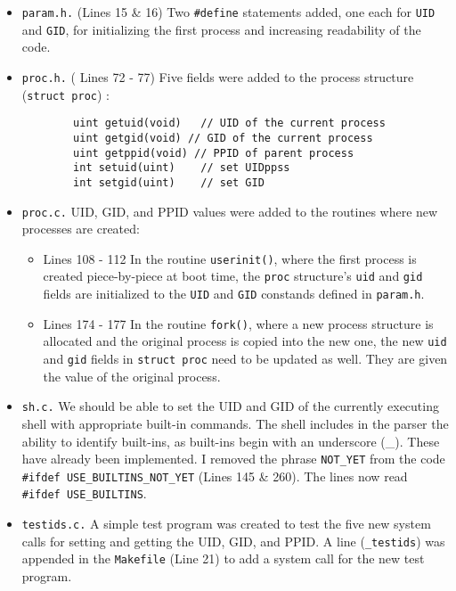 \documentclass[11pt,letterpaper]{report}
\begin{document}
	\begin{itemize}
		
		\item {\tt param.h.} ({\color{red}Lines 15 \& 16}) Two {\tt \#define} statements added, one each for {\tt UID} and {\tt GID}, for initializing the first process and increasing readability of the code.
		
		\item {\tt proc.h.} ({\color{red} Lines 72 - 77}) Five fields were added to the process structure ({\tt struct proc}) :
		\begin{verbatim}
		uint getuid(void)	// UID of the current process
		uint getgid(void) // GID of the current process
		uint getppid(void) // PPID of parent process
		int setuid(uint)	// set UIDppss
		int setgid(uint)	// set GID
		\end{verbatim}
		
		\item {\tt proc.c.} UID, GID, and PPID values were added to the routines where new processes are created:
		\begin{itemize}
			\item {\color{red}Lines 108 - 112} In the routine {\tt userinit()}, where the first process is created piece-by-piece at boot time, the {\tt proc} structure's {\tt uid} and {\tt gid} fields are initialized to the {\tt UID} and {\tt GID} constands defined in {\tt param.h}.
			
			\item {\color{red}Lines 174 - 177} In the routine {\tt fork()}, where a new process structure is allocated and the original process is copied into the new one, the new {\tt uid} and {\tt gid} fields in {\tt struct proc} need to be updated as well. They are given the value of the original process.
		\end{itemize}
	
	\item {\tt sh.c.} We should be able to set the UID and GID of the currently executing shell with appropriate built-in commands. The shell includes in the parser the ability to identify built-ins, as built-ins begin with an underscore (\_). These have already been implemented. I removed the phrase {\tt NOT\_YET} from the code {\tt \#ifdef USE\_BUILTINS\_NOT\_YET} ({\color{red}Lines 145 \& 260}). The lines now read {\tt \#ifdef USE\_BUILTINS}.
	
	\item {\tt testids.c.} A simple test program was created to test the five new system calls for setting and getting the UID, GID, and PPID. A line ({\tt \_testids}) was appended in the {\tt Makefile} ({\color{red}Line 21}) to add a system call for the new test program.\
	

\end{itemize}
\end{document}
